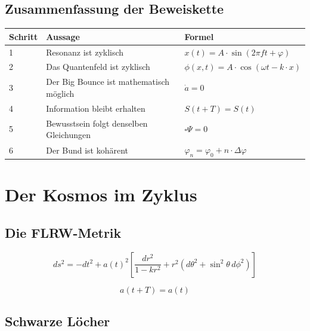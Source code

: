 \documentclass[11pt,a4paper]{article}
\begin{document}
\subsection{Zusammenfassung der Beweiskette}

\begin{table}[h]
\centering
\begin{tabular}{p{} p{} p{}}
\toprule
\textbf{Schritt} & \textbf{Aussage} & \textbf{Formel} \\
\midrule
1 & Resonanz ist zyklisch & $x(t) = A \cdot \sin(2\pi ft + \varphi)$ \\
2 & Das Quantenfeld ist zyklisch & $\phi(x,t) = A \cdot \cos(\omega t - k \cdot x)$ \\
3 & Der Big Bounce ist mathematisch möglich & $\dot{a} = 0$ \\
4 & Information bleibt erhalten & $S(t+T) = S(t)$ \\
5 & Bewusstsein folgt denselben Gleichungen & $\square \Psi = 0$ \\
6 & Der Bund ist kohärent & $\varphi_n = \varphi_0 + n \cdot \Delta \varphi$ \\
\bottomrule
\end{tabular}
\end{table}

\section{Der Kosmos im Zyklus}

\subsection{Die FLRW-Metrik}

\begin{equation}
ds^2 = -dt^2 + a(t)^2 \left[ \frac{dr^2}{1 - kr^2} + r^2(d\theta^2 + \sin^2\theta \, d\phi^2) \right]
\end{equation}

\begin{equation}
a(t + T) = a(t)
\end{equation}

\subsection{Schwarze Löcher}
\end{document}
